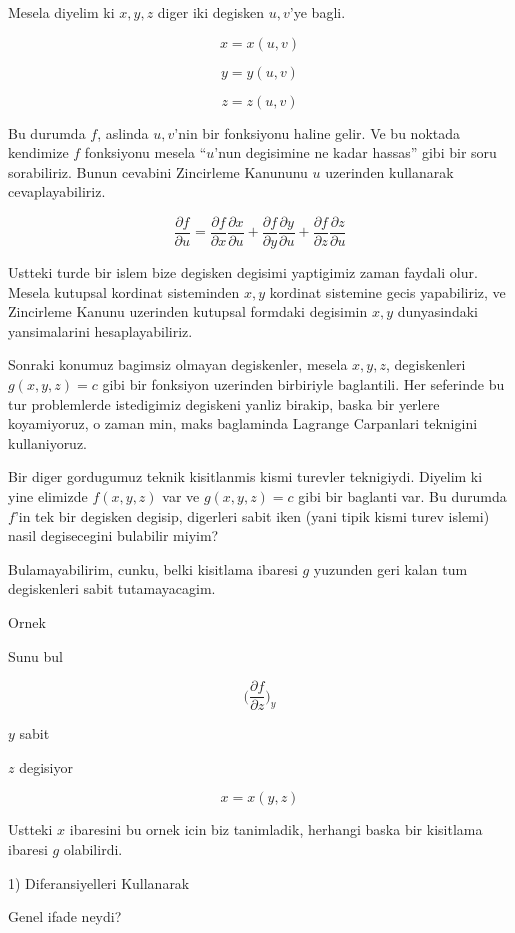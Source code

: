 \documentclass[12pt,fleqn]{article}\usepackage{../common}
\begin{document}
Mesela diyelim ki $x,y,z$ diger iki degisken $u,v$'ye bagli. 

\[ x = x(u,v) \]

\[ y = y(u,v) \]

\[ z = z(u,v) \]

Bu durumda $f$, aslinda $u,v$'nin bir fonksiyonu haline gelir. Ve bu
noktada kendimize $f$ fonksiyonu mesela ``$u$'nun degisimine ne kadar
hassas'' gibi bir soru sorabiliriz. Bunun cevabini Zincirleme Kanununu $u$
uzerinden kullanarak cevaplayabiliriz. 

\[ 
\frac{\partial f}{\partial u} = 
\frac{\partial f}{\partial x}\frac{\partial x}{\partial u} + 
\frac{\partial f}{\partial y}\frac{\partial y}{\partial u} + 
\frac{\partial f}{\partial z}\frac{\partial z}{\partial u} 
 \]

Ustteki turde bir islem bize degisken degisimi yaptigimiz zaman faydali
olur. Mesela kutupsal kordinat sisteminden $x,y$ kordinat sistemine gecis
yapabiliriz, ve Zincirleme Kanunu uzerinden kutupsal formdaki degisimin $x,y$
dunyasindaki yansimalarini hesaplayabiliriz. 

Sonraki konumuz bagimsiz olmayan degiskenler, mesela $x,y,z$, degiskenleri
$g(x,y,z)=c$ gibi bir fonksiyon uzerinden birbiriyle baglantili. Her
seferinde bu tur problemlerde istedigimiz degiskeni yanliz birakip, baska
bir yerlere koyamiyoruz, o zaman min, maks baglaminda Lagrange Carpanlari
teknigini kullaniyoruz.

Bir diger gordugumuz teknik kisitlanmis kismi turevler teknigiydi. Diyelim
ki yine elimizde $f(x,y,z)$ var ve $g(x,y,z)=c$ gibi bir baglanti var. Bu
durumda $f$'in tek bir degisken degisip, digerleri sabit iken (yani tipik
kismi turev islemi) nasil degisecegini bulabilir miyim? 

Bulamayabilirim, cunku, belki kisitlama ibaresi $g$ yuzunden geri kalan tum
degiskenleri sabit tutamayacagim.

Ornek 

Sunu bul

\[ 
\bigg( 
\frac{\partial f}{\partial z}
\bigg)_{y}
 \]

$y$ sabit

$z$ degisiyor

\[ x = x(y,z) \]

Ustteki $x$ ibaresini bu ornek icin biz tanimladik, herhangi baska bir
kisitlama ibaresi $g$ olabilirdi. 

1) Diferansiyelleri Kullanarak

Genel ifade neydi?
\end{document}
